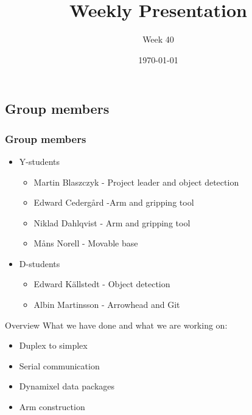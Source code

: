 \documentclass{beamer}
\title{Weekly Presentation}
\subtitle{Week 40}
\author{}
\institute{Luleå University of Technology}
\date{\today}
\begin{document}
\begin{frame}
    \titlepage
\end{frame}




\begin{frame}
    \subsection{Group members}
    \frametitle{Group members }
    \begin{itemize}
        \item Y-students
        \begin{itemize}
            \item Martin Blaszczyk - Project leader and object detection
            \item Edward Cedergård -Arm and gripping tool
            \item Niklad Dahlqvist -  Arm and gripping tool
            \item Måns Norell - Movable base
        \end{itemize}
        \item D-students
        \begin{itemize}
            \item Edward Källstedt - Object detection
            \item Albin Martinsson - Arrowhead and Git
        \end{itemize}  
    \end{itemize}
\end{frame}




\begin{frame}{Overview}
What we have done and what we are working on:
    \begin{itemize}
        \item Duplex to simplex
        \item Serial communication
        \item Dynamixel data packages
        \item Arm construction
    \end{itemize}
\end{frame}


\end{document}
